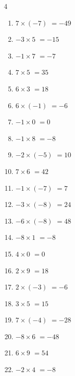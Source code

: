 \begin{multicols}{4}
\begin{enumerate}
  \item $7\times (-7)$
        $=-49$

  \item $-3\times 5$
        $=-15$

  \item $-1\times 7$
        $=-7$

  \item $7\times 5$
        $=35$

  \item $6\times 3$
        $=18$

  \item $6\times (-1)$
        $=-6$

  \item $-1\times 0$
        $=0$

  \item $-1\times 8$
        $=-8$

  \item $-2\times (-5)$
        $=10$

  \item $7\times 6$
        $=42$

  \item $-1\times (-7)$
        $=7$

  \item $-3\times (-8)$
        $=24$

  \item $-6\times (-8)$
        $=48$

\columnbreak %

\resetques

  \item $-8\times 1$
        $=-8$

  \item $4\times 0$
        $=0$

  \item $2\times 9$
        $=18$

  \item $2\times (-3)$
        $=-6$

  \item $3\times 5$
        $=15$

  \item $7\times (-4)$
        $=-28$

  \item $-8\times 6$
        $=-48$

  \item $6\times 9$
        $=54$

  \item $-2\times 4$
        $=-8$


\end{enumerate}
\end{multicols}

